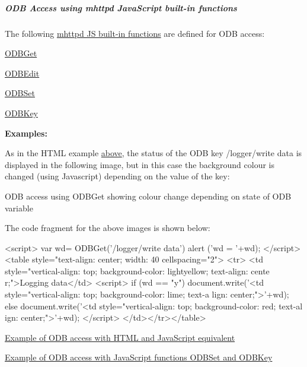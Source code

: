 \par
\hypertarget{RC_mhttpd_custom_ODB_access_RC_mhttpd_custom_odb_js}{}\subparagraph{ODB Access using mhttpd JavaScript built-\/in functions}\label{RC_mhttpd_custom_ODB_access_RC_mhttpd_custom_odb_js}
The following \hyperlink{RC_mhttpd_custom_js_lib}{mhttpd JS built-\/in functions} are defined for ODB access:
\begin{DoxyItemize}
\item \hyperlink{RC_mhttpd_custom_ODB_access_RC_mhttpd_custom_odbget}{ODBGet}
\item \hyperlink{RC_mhttpd_custom_ODB_access_RC_mhttpd_custom_odbedit}{ODBEdit}
\item \hyperlink{RC_mhttpd_custom_ODB_access_RC_mhttpd_custom_odbset}{ODBSet}
\item \hyperlink{RC_mhttpd_custom_ODB_access_RC_mhttpd_custom_odbkey}{ODBKey}
\end{DoxyItemize}

{\bfseries Examples:} 
\begin{DoxyEnumerate}
\item As in the HTML example \hyperlink{RC_mhttpd_custom_ODB_access_odb_tag_ex1}{above}, the status of the ODB key /logger/write data is displayed in the following image, but in this case the background colour is changed (using Javascript) depending on the value of the key:

\begin{center} ODB access using ODBGet showing colour change depending on state of ODB variable  \par
  \end{center}  \par
 The code fragment for the above images is shown below: 
\begin{DoxyCode}
<script>
var wd= ODBGet('/logger/write data')
alert ('wd = '+wd);
</script>
<table style="text-align: center; width: 40%
cellspacing="2">
<tr>
<td style="vertical-align: top; background-color:  lightyellow; text-align: cente
      r;">Logging data</td>
<script>
if (wd == "y")
   document.write('<td style="vertical-align: top; background-color: lime; text-a
      lign: center;">'+wd);
else
   document.write('<td style="vertical-align: top; background-color: red; text-al
      ign: center;">'+wd);
</script>
</td></tr></table>
\end{DoxyCode}



\item \hyperlink{RC_mhttpd_custom_ODB_access_examples_RC_mhttpd_js_example1}{Example of ODB access with HTML and JavaScript equivalent} 
\item \hyperlink{RC_mhttpd_custom_ODB_access_examples_RC_mhttpd_js_example2}{Example of ODB access with JavaScript functions ODBSet and ODBKey} 
\end{DoxyEnumerate}


